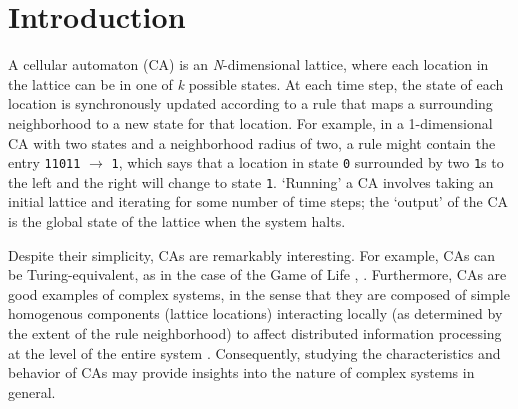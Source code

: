 \section{Introduction}

A cellular automaton (CA) is an \textit{N}-dimensional lattice, where each location in the lattice can be in one of \textit{k} possible states. 
At each time step, the state of each location is synchronously updated according to a rule that maps a surrounding neighborhood to 
a new state for that location. For example, in a 1-dimensional CA with two states and a neighborhood radius of two, a rule might contain the entry \texttt{11011} 
$\rightarrow$ \texttt{1}, which says that a location in state \texttt{0} surrounded by two \texttt{1}s to the left and the right will change to state \texttt{1}. 
`Running' a CA involves taking an initial lattice and iterating for some number of time steps; the `output' of the CA is the global state of the 
lattice when the system halts.

Despite their simplicity, CAs are remarkably interesting. For example, CAs can be Turing-equivalent, as in the case of the Game of Life 
\cite{berlekamp_winning_1982}, \cite{adamatzky_turing_2001}. Furthermore, CAs are good examples of complex systems, in the sense that 
they are composed of simple homogenous components (lattice locations) interacting locally (as determined by the extent of the rule neighborhood) to affect  distributed information processing at the level of the entire system \cite{mitchell_complexity:_2009}. Consequently, studying the characteristics and 
behavior of CAs may provide insights into the nature of complex systems in general. 

